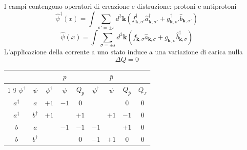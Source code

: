 I campi contengono operatori di creazione e distruzione: protoni e antiprotoni
$$
\hat{\psi}^\dagger(x) = \int \sum_{\sigma'=\pm s} d^3\mathbf{k} (f_{\mathbf{k},\sigma'}^\dagger \hat{a}_{\mathbf{k},\sigma'}^\dagger + g_{\mathbf{k},\sigma'}^\dagger \hat{b}_{\mathbf{k},\sigma'})
$$
$$
\hat{\psi}(x) = \int \sum_{\sigma=\pm s} d^3\mathbf{k} (f_{\mathbf{k},\sigma} \hat{a}_{\mathbf{k},\sigma} + g_{\mathbf{k},\sigma} \hat{b}_{\mathbf{k},\sigma}^\dagger)
$$
L'applicazione della corrente a uno stato induce a una variazione di carica nulla
$$
\Delta Q = 0
$$
\begin{center}
\begin{tabular}{|c|c|c|c|c|c|c|c|c|}
\hline
 & & \multicolumn{3}{c|}{$p$} & \multicolumn{3}{c|}{$\bar{p}$} & \\ 
\cline{1-9} 
$\psi^\dagger$ & $\psi$ & $\psi^\dagger$ & $\psi$ & $Q_p$ & $\psi^\dagger$ & $\psi$ & $Q_{\bar{p}}$ & $Q_T$\\ 
\hline
$a^\dagger$ & $a$ & $+1$ & $-1$ & $0$ & & & $0$ & $0$ \\ 
\hline
$a^\dagger$ & $b^\dagger$ & $+1$ & & $+1$ & & $+1$ & $-1$ & $0$ \\ 
\hline
$b$ & $a$ & & $-1$ & $-1$ & $-1$ & & $+1$ & $0$ \\ 
\hline
$b$ & $b^\dagger$ & & & $0$ & $-1$ & $+1$ & $0$ & $0$ \\ 
\hline
\end{tabular}
\end{center}
